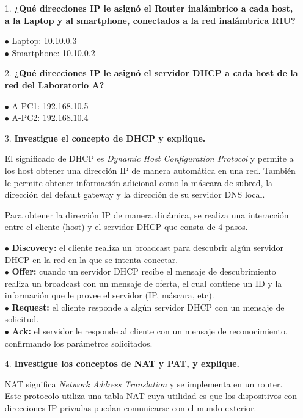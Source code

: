 \documentclass{article}
\begin{document}
\begin{itemize}
\item[1.] \textbf{¿Qué direcciones IP le asignó el Router inalámbrico a cada host, a la Laptop y al smartphone, conectados a la red inalámbrica RIU?}

$\bullet$ Laptop: 10.10.0.3\\
$\bullet$ Smartphone: 10.10.0.2

\item[2.] \textbf{¿Qué direcciones IP le asignó el servidor DHCP a cada host de la red del Laboratorio
A?}

$\bullet$ A-PC1: 192.168.10.5\\
$\bullet$ A-PC2: 192.168.10.4

\item[3.] \textbf{Investigue el concepto de DHCP y explique.}

El significado de DHCP es \textit{Dynamic Host Configuration Protocol} y permite a los host obtener una dirección IP de manera automática en una red. También le permite obtener información adicional como la máscara de subred, la dirección del default gateway y la dirección de su servidor DNS local.

Para obtener la dirección IP de manera dinámica, se realiza una interacción entre el cliente (host) y el servidor DHCP que consta de 4 pasos.

$\bullet$ \textbf{Discovery:} el cliente realiza un broadcast para descubrir algún servidor DHCP en la red en la que se intenta conectar.\\
$\bullet$ \textbf{Offer:} cuando un servidor DHCP recibe el mensaje de descubrimiento realiza un broadcast con un mensaje de oferta, el cual contiene un ID y la información que le provee el servidor (IP, máscara, etc).\\
$\bullet$ \textbf{Request:} el cliente responde a algún servidor DHCP con un mensaje de solicitud.\\
$\bullet$ \textbf{Ack:} el servidor le responde al cliente con un mensaje de reconocimiento, confirmando los parámetros solicitados.

\item[4.] \textbf{Investigue los conceptos de NAT y PAT, y explique.}

NAT significa \textit{Network Address Translation} y se implementa en un router. Este protocolo utiliza una tabla NAT cuya utilidad es que los dispositivos con direcciones IP privadas puedan comunicarse con el mundo exterior.


\end{itemize}
\end{document}
